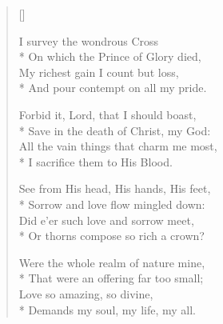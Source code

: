 \newHymn


\begin{verse}[\versewidth]

 I survey the wondrous Cross\\*
On which the Prince of Glory died,\\
My richest gain I count but loss,\\*
And pour contempt on all my pride.

Forbid it, Lord, that I should  boast,\\*
Save in the death of Christ, my God:\\
All the vain things that charm me most,\\*
I sacrifice them to His Blood.

See from His head, His hands,  His feet,\\*
Sorrow and love flow mingled  down:\\
Did e'er such love and sorrow meet,\\*
Or thorns compose so rich a crown?

Were the whole realm of   nature mine,\\*
That were an offering far too small;\\
Love so amazing, so divine,\\*
Demands my soul, my life, my all.

\end{verse}



